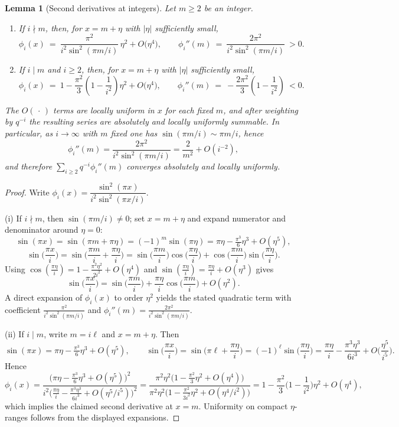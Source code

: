 \documentclass[11pt,a4paper]{amsart}
\theoremstyle{plain}
\newtheorem{lemma}[theorem]{Lemma}
\theoremstyle{definition}
\theoremstyle{remark}
\begin{document}
\begin{lemma}[Second derivatives at integers]\label{lem:second-derivatives}
Let $m\ge2$ be an integer.
\begin{enumerate}
\item If $i\nmid m$, then, for $x=m+\eta$ with $|\eta|$ sufficiently small,
\[
\phi_i(x)\ =\ \frac{\pi^2}{i^2\sin^2(\pi m/i)}\,\eta^2+O\big(\eta^4\big),
\qquad
\phi_i''(m)\ =\ \frac{2\pi^2}{i^2\sin^2(\pi m/i)}\ >0.
\]
\item If $i\mid m$ and $i\ge2$, then, for $x=m+\eta$ with $|\eta|$ sufficiently small,
\[
\phi_i(x)\ =\ 1-\frac{\pi^2}{3}\!\left(1-\frac1{i^2}\right)\eta^2+O\big(\eta^4\big),
\qquad
\phi_i''(m)\ =\ -\frac{2\pi^2}{3}\!\left(1-\frac1{i^2}\right)\ <0.
\]
\end{enumerate}
The $O(\,\cdot\,)$ terms are locally uniform in $x$ for each fixed $m$, and after weighting by $q^{-i}$ the resulting series are absolutely and locally uniformly summable. In particular, as $i\to\infty$ with $m$ fixed one has $\sin(\pi m/i)\sim \pi m/i$, hence
\[
\phi_i''(m)=\frac{2\pi^2}{i^2\sin^2(\pi m/i)}=\frac{2}{m^2}+O(i^{-2}),
\]
and therefore $\sum_{i\ge2} q^{-i}\phi_i''(m)$ converges absolutely and locally uniformly.
\end{lemma}

\begin{proof}
Write $\phi_i(x)=\dfrac{\sin^2(\pi x)}{i^2\sin^2(\pi x/i)}$. 

(i) If $i\nmid m$, then $\sin(\pi m/i)\neq 0$; set $x=m+\eta$ and expand numerator and denominator around $\eta=0$:
\[
\sin(\pi x)=\sin(\pi m+\pi\eta)=(-1)^m\sin(\pi\eta)=\pi\eta-\tfrac{\pi^3}{6}\eta^3+O(\eta^5),
\]
\[
\sin\!\Big(\frac{\pi x}{i}\Big)=\sin\!\Big(\frac{\pi m}{i}+\frac{\pi\eta}{i}\Big)
=\sin\!\Big(\frac{\pi m}{i}\Big)\cos\!\Big(\frac{\pi\eta}{i}\Big)
+\cos\!\Big(\frac{\pi m}{i}\Big)\sin\!\Big(\frac{\pi\eta}{i}\Big).
\]
Using $\cos(\tfrac{\pi\eta}{i})=1-\tfrac{\pi^2\eta^2}{2i^2}+O(\eta^4)$ and $\sin(\tfrac{\pi\eta}{i})=\tfrac{\pi\eta}{i}+O(\eta^3)$ gives
\[
\sin\!\Big(\frac{\pi x}{i}\Big)=\sin\!\Big(\frac{\pi m}{i}\Big)+\frac{\pi\eta}{i}\cos\!\Big(\frac{\pi m}{i}\Big)+O(\eta^2).
\]
A direct expansion of $\phi_i(x)$ to order $\eta^2$ yields the stated quadratic term with coefficient $\frac{\pi^2}{i^2\sin^2(\pi m/i)}$ and $\phi_i''(m)=\frac{2\pi^2}{i^2\sin^2(\pi m/i)}$.

(ii) If $i\mid m$, write $m=i\ell$ and $x=m+\eta$. Then
\[
\sin(\pi x)=\pi\eta-\tfrac{\pi^3}{6}\eta^3+O(\eta^5),\qquad
\sin\!\Big(\frac{\pi x}{i}\Big)=\sin\!\Big(\pi\ell+\frac{\pi\eta}{i}\Big)=(-1)^\ell\sin\!\Big(\frac{\pi\eta}{i}\Big)=\frac{\pi\eta}{i}-\frac{\pi^3\eta^3}{6i^3}+O\!\Big(\frac{\eta^5}{i^5}\Big).
\]
Hence
\[
\phi_i(x)=\frac{\big(\pi\eta-\tfrac{\pi^3}{6}\eta^3+O(\eta^5)\big)^2}{i^2\big(\tfrac{\pi\eta}{i}-\tfrac{\pi^3\eta^3}{6i^3}+O(\eta^5/i^5)\big)^2}
=\frac{\pi^2\eta^2\big(1-\tfrac{\pi^2}{3}\eta^2+O(\eta^4)\big)}{\pi^2\eta^2\big(1-\tfrac{\pi^2}{3i^2}\eta^2+O(\eta^4/i^2)\big)}
=1-\frac{\pi^2}{3}\Big(1-\frac{1}{i^2}\Big)\eta^2+O(\eta^4),
\]
which implies the claimed second derivative at $x=m$. Uniformity on compact $\eta$-ranges follows from the displayed expansions.
\end{proof}
\end{document}
